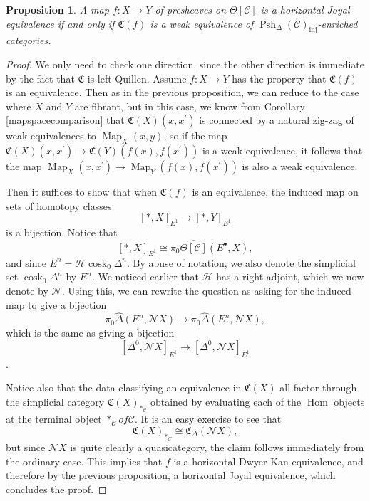\documentclass{amsart}
\numberwithin{equation}{section}
\theoremstyle{plain}   %
\newtheorem{prop}[subsection]{Proposition}
\theoremstyle{remark}
\theoremstyle{plain}
\DeclareMathOperator{\Psh}{Psh}
\DeclareMathOperator{\Map}{Map}
\DeclareMathOperator{\Hom}{Hom}
\newcommand{\psh}[1]{\ensuremath{\widehat{#1}}}
\newcommand{\C}{\ensuremath{\mathcal{C}}}
\newcommand{\cellset}{\ensuremath{\widehat{\Theta[\mathcal{C}]}}}
\begin{document}
\begin{prop}\label{conservativity}
	A map \(f:X\to Y\) of presheaves on \(\Theta[\C]\) is a horizontal Joyal equivalence if and only if \(\mathfrak{C}(f)\) is a weak equivalence of \(\Psh_\Delta (\C)_{\mathrm{inj}}\)-enriched categories.
\end{prop}
\begin{proof}
	We only need to check one direction, since the other direction is immediate by the fact that \(\mathfrak{C}\) is left-Quillen.  Assume \(f:X\to Y\) has the property that \(\mathfrak{C}(f)\) is an equivalence. Then as in the previous proposition, we can reduce to the case where \(X\) and \(Y\) are fibrant, but in this case, we know from Corollary \ref{mapspacecomparison} that \(\mathfrak{C}(X)(x,x^\prime)\) is connected by a natural zig-zag of weak equivalences to \(\Map_X(x,y)\), so if the map  \(\mathfrak{C}(X)(x,x^\prime)\to \mathfrak{C}(Y)(f(x),f(x^\prime))\) is a weak equivalence, it follows that the map \(\Map_X(x,x^\prime)\to \Map_Y(f(x),f(x^\prime))\) is also a weak equivalence.

	Then it suffices to show that when \(\mathfrak{C}(f)\) is an equivalence, the induced map on sets of homotopy classes
	\[[\ast,X]_{E^1} \to [\ast,Y]_{E^1}\]
	is a bijection.  Notice that
	\[[\ast,X]_{E^1} \cong \pi_0 \cellset(E^\bullet,X),\]
	and since \(E^n=\mathscr{H}\operatorname{cosk}_0 \Delta^n\). By abuse of notation, we also denote the simplicial set \(\operatorname{cosk}_0 \Delta^n\) by \(E^n\).  We noticed earlier that \(\mathscr{H}\) has a right adjoint, which we now denote by \(\mathscr{N}\). Using this, we can rewrite the question as asking for the induced map to give a bijection
	\[\pi_0 \psh{\Delta}(E^n,\mathscr{N}X) \to \pi_0 \psh{\Delta}(E^n,\mathscr{N}X),\]
	which is the same as giving a bijection
	\[[\Delta^0,\mathscr{N}X]_{E^1}\to [\Delta^0,\mathscr{N}X]_{E^1}\].

	Notice also that the data classifying an equivalence in \(\mathfrak{C}(X)\) all factor through the simplicial category \(\mathfrak{C}(X)_{\ast_\C}\) obtained by evaluating each of the \(\Hom\) objects at the terminal object \(\ast_{\C} of \C\).  It is an easy exercise to see that
	\[\mathfrak{C}(X)_{\ast_C} \cong \mathfrak{C}_\Delta (\mathscr{N}X),\]
	but since \(\mathscr{N}X\) is quite clearly a quasicategory, the claim follows immediately from the ordinary case.  This implies that \(f\) is a horizontal Dwyer-Kan equivalence, and therefore by the previous proposition, a horizontal Joyal equivalence, which concludes the proof.
\end{proof}
\end{document}

